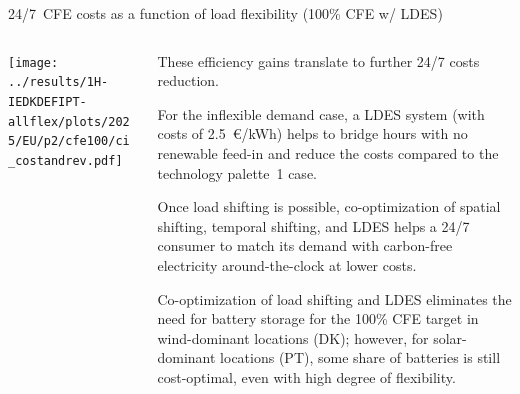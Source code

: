 \begin{frame}{24/7~CFE costs as a function of load flexibility (100\% CFE w/ LDES)}
\label{247costs-p2}

  {\footnotesize
  \vspace{0.2cm}
  
  \begin{columns}[T]

  \begin{column}{9cm}
  \centering
  \texttt{[image: ../results/1H-IEDKDEFIPT-allflex/plots/2025/EU/p2/cfe100/ci\_costandrev.pdf]}
  \end{column}

  \begin{column}{6cm}
  These efficiency gains translate to further 24/7 costs reduction.
  
  \vspace{0.1cm} 
  For the inflexible demand case, a LDES system (with costs of 2.5~€/kWh) helps to bridge hours with no renewable feed-in and reduce the costs compared to the technology palette~1 case. 

  \vspace{0.1cm} 
  Once load shifting is possible, co-optimization of spatial shifting, temporal shifting, and LDES helps a 24/7 consumer to match its demand with carbon-free electricity around-the-clock at lower costs.

  \vspace{0.1cm} 
  Co-optimization of load shifting and LDES eliminates the need for battery storage for the 100\% CFE target in wind-dominant locations (DK); however, for solar-dominant locations (PT), some share of batteries is still cost-optimal, even with high degree of flexibility.

  \end{column}
  \end{columns}
  }
\end{frame}



